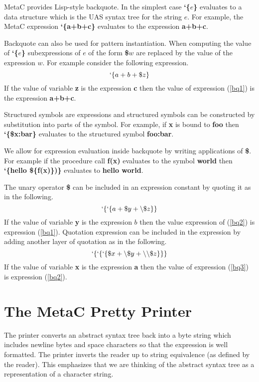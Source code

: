 \documentclass{article}
\begin{document}
MetaC provides Lisp-style backquote.
In the simplest case {\bf `\{$e$\}} evaluates to a data structure which is the UAS syntax tree for
the string $e$.  For example, the MetaC expression {\bf `\{a+b+c\}}
evaluates to the expression {\bf a+b+c}.

Backquote can also be used for pattern instantiation.
When computing the value of {\bf `\{$e$\}} subexpressions of $e$ of the form {\bf \$$w$} are replaced by the value of the expression $w$.
For example consider the following expression.
\begin{equation}
\label{bq1}
`\{a+b+\$z\}
\end{equation}
If the value of variable {\bf z} is the expression {\bf c} then the value of expression (\ref{bq1}) is the expression {\bf a+b+c}.

Structured symbols are expressions and structured symbols can be constructed by substitution into parts of the symbol.
For example, if {\bf x} is bound to {\bf foo} then {\bf `\{\$x:bar\}} evaluates to the structured symbol {\bf foo:bar}.

We allow for expression evaluation inside backquote by writing applications of {\bf \$}.  For example if the procedure call {\bf f(x)} evaluates to the symbol {\bf world} then
{\bf `\{hello \$\{f(x)\})\}} evaluates to {\bf hello world}.

The unary operator {\bf \$} can be included in an expression constant by quoting it as in the following.
\begin{equation}
\label{bq2}
`\{`\{a + \$y + \backslash\$z\}\}
\end{equation}
If the value of variable {\bf y} is the expression $b$ then the value expression of (\ref{bq2}) is expression (\ref{bq1}).
Quotation expression can be included in the expression by adding another layer of quotation as in the following.
\begin{equation}
\label{bq3}
`\{`\{`\{\$x + \backslash\$y + \backslash\backslash\$z\}\}\}
\end{equation}
If the value of variable {\bf x} is the expression {\bf a} then the value of expression (\ref{bq3}) is expression (\ref{bq2}).


\section{The MetaC Pretty Printer}

The printer converts an abstract syntax tree back into a byte string which includes newline bytes and space characters
so that the expression is well formatted. The printer inverts the reader up to string equivalence (as defined by the reader).
This emphasizes that we are thinking of the abstract syntax tree as a representation of a character string.
\end{document}
